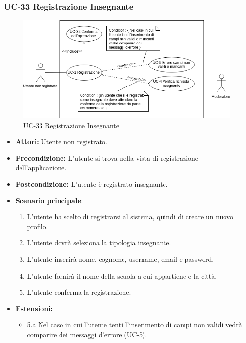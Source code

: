\subsubsection{UC-33 Registrazione Insegnante}
\begin{figure}[h]
	\centering
	\includegraphics[scale=0.7]{images/UC-1.png}
	\caption{UC-33 Registrazione Insegnante}
\end{figure}	

\begin{itemize}
	\item \textbf{Attori: }Utente non registrato.
	\item \textbf{Precondizione: }L'utente si trova nella vista di registrazione dell'applicazione.
	\item \textbf{Postcondizione: }L'utente è registrato insegnante.
	\item \textbf{Scenario principale: }
	\begin{enumerate}
		\item L'utente ha scelto di registrarsi al sistema, quindi di creare un nuovo profilo. 
		\item L'utente dovrà seleziona la tipologia insegnante. 
		\item L'utente inserirà nome, cognome, username, email e password.
		\item L'utente fornirà il nome della scuola a cui appartiene e la città.
		\item L'utente conferma la registrazione.
	\end{enumerate}
	\item \textbf{Estensioni: }
	\begin{itemize}
		\item 5.a Nel caso in cui l'utente tenti l'inserimento di campi non validi vedrà comparire dei messaggi d'errore (UC-5).

	\end{itemize}
\end{itemize}

